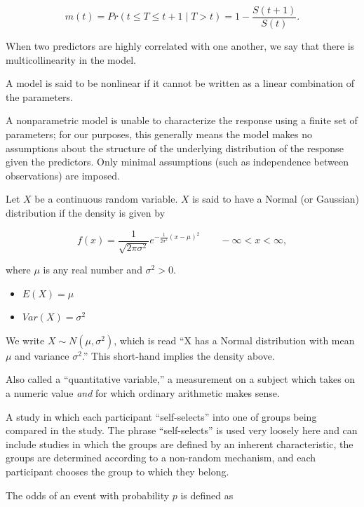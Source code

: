 \documentclass[
  letterpaper,
  DIV=11,
  numbers=noendperiod]{scrreprt}
\providecommand{\tightlist}{%
  \setlength{\itemsep}{0pt}\setlength{\parskip}{0pt}}\usepackage{longtable,booktabs,array}
\theoremstyle{definition}
\theoremstyle{definition}
\theoremstyle{remark}
\begin{document}
\[m(t) = Pr(t \leq T \leq t + 1 \mid T > t) = 1 - \frac{S(t + 1)}{S(t)}.\]

\begin{description}
\tightlist
\item[Multicollinearity (Definition~\ref{def-multicollinearity})]
When two predictors are highly correlated with one another, we say that
there is multicollinearity in the model.
\item[Nonlinear Model (Definition~\ref{def-nlm})]
A model is said to be nonlinear if it cannot be written as a linear
combination of the parameters.
\item[Nonparametric Model (Definition~\ref{def-nonparametric-model})]
A nonparametric model is unable to characterize the response using a
finite set of parameters; for our purposes, this generally means the
model makes no assumptions about the structure of the underlying
distribution of the response given the predictors. Only minimal
assumptions (such as independence between observations) are imposed.
\item[Normal (Gaussian) Distribution
(Definition~\ref{def-normal-distribution})]
Let \(X\) be a continuous random variable. \(X\) is said to have a
Normal (or Gaussian) distribution if the density is given by
\end{description}

\[f(x) = \frac{1}{\sqrt{2 \pi \sigma^2}} e^{-\frac{1}{2\sigma^2} (x - \mu)^2} \qquad -\infty < x < \infty,\]

where \(\mu\) is any real number and \(\sigma^2 > 0\).

\begin{itemize}
\tightlist
\item
  \(E(X) = \mu\)
\item
  \(Var(X) = \sigma^2\)
\end{itemize}

We write \(X \sim N\left(\mu, \sigma^2\right)\), which is read ``X has a
Normal distribution with mean \(\mu\) and variance \(\sigma^2\).'' This
short-hand implies the density above.

\begin{description}
\tightlist
\item[Numeric Variable (Definition~\ref{def-numeric-variable})]
Also called a ``quantitative variable,'' a measurement on a subject
which takes on a numeric value \emph{and} for which ordinary arithmetic
makes sense.
\item[Observational Study (Definition~\ref{def-observational-study})]
A study in which each participant ``self-selects'' into one of groups
being compared in the study. The phrase ``self-selects'' is used very
loosely here and can include studies in which the groups are defined by
an inherent characteristic, the groups are determined according to a
non-random mechanism, and each participant chooses the group to which
they belong.
\item[Odds (Definition~\ref{def-odds})]
The odds of an event with probability \(p\) is defined as
\end{description}
\end{document}
